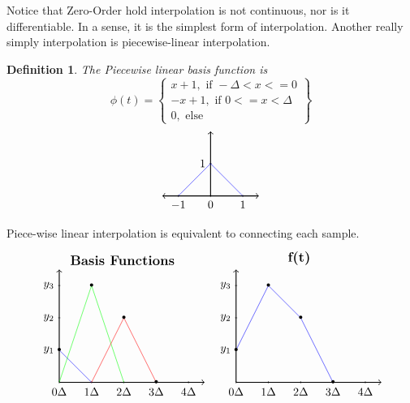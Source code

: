 \documentclass{article}
\newtheorem{definition}{Definition}
\begin{document}
Notice that Zero-Order hold interpolation is not continuous, nor is it differentiable.
In a sense, it is the simplest form of interpolation. Another really simply interpolation is piecewise-linear interpolation.
\begin{definition}
    The Piecewise linear basis function is
    \[
        \phi(t) = \left\{
        \begin{array}{c}
            x + 1, \text{ if } -\Delta < x <= 0\\
            -x + 1, \text{ if } 0 <= x < \Delta\\
            0, \text{ else}
        \end{array}
        \right\}
    \]
    \[
        \begin{tikzpicture}
            \draw[thick,<->] (-1.5, 0) -- (1.5,0);
            \draw[thick,->] (0,0) -- (0,2);
            \draw[blue] (-1, 0) -- (0, 1);
            \draw[blue] (0, 1) -- (1, 0);
            \foreach \x in {-1,0,1}
                \draw (\x cm,1pt) -- (\x cm,-1pt) node[anchor=north] {$\x$};
            \foreach \y in {1}
                \draw (1pt,\y cm) -- (-1pt,\y cm) node[anchor=east] {$\y$};
        \end{tikzpicture}
    \]
\end{definition}
Piece-wise linear interpolation is equivalent to connecting each sample.
\[
    \begin{array}{cc}
        \begin{tikzpicture}
            \draw[thick,->] (0, 0) -- (4.5,0);
            \draw[thick,->] (0,0) -- (0,3.5);
            \foreach \x in {0,1, 2, 3, 4}
                \draw (\x cm,1pt) -- (\x cm,-1pt) node[anchor=north] {$\x \Delta$};
            \foreach \y in {1,2,3}
                \draw (1pt,\y cm) -- (-1pt,\y cm) node[anchor=east] {$y_{\y}$};
                \draw[blue] (0, 1) -- (1, 0);
                \draw[green] (0, 0) -- (1, 3);
                \draw[green] (1, 3) -- (2, 0);
                \draw[red] (1, 0) -- (2, 2);
                \draw[red] (2, 2) -- (3, 0);
            \foreach \Point in {(0,1), (2,2), (1,3), (3, 0)}{
                \node at \Point {\textbullet};
            }
            \node[above,font=\large\bfseries] at (current bounding box.north) {Basis Functions};
        \end{tikzpicture}
        &
        \begin{tikzpicture}
            \draw[thick,->] (0, 0) -- (4.5,0);
            \draw[thick,->] (0,0) -- (0,3.5);
            \foreach \x in {0,1, 2, 3, 4}
                \draw (\x cm,1pt) -- (\x cm,-1pt) node[anchor=north] {$\x \Delta$};
            \foreach \y in {1,2,3}
                \draw (1pt,\y cm) -- (-1pt,\y cm) node[anchor=east] {$y_{\y}$};
            \draw[blue] (0, 1) -- (1, 3);
            \draw[blue] (1, 3) -- (2, 2);
            \draw[blue] (2, 2) -- (3, 0);
            \foreach \Point in {(0,1), (2,2), (1,3), (3, 0)}{
                \node at \Point {\textbullet};
            }
            \node[above,font=\large\bfseries] at (current bounding box.north) {f(t)};
        \end{tikzpicture}
    \end{array}
\]
\end{document}
